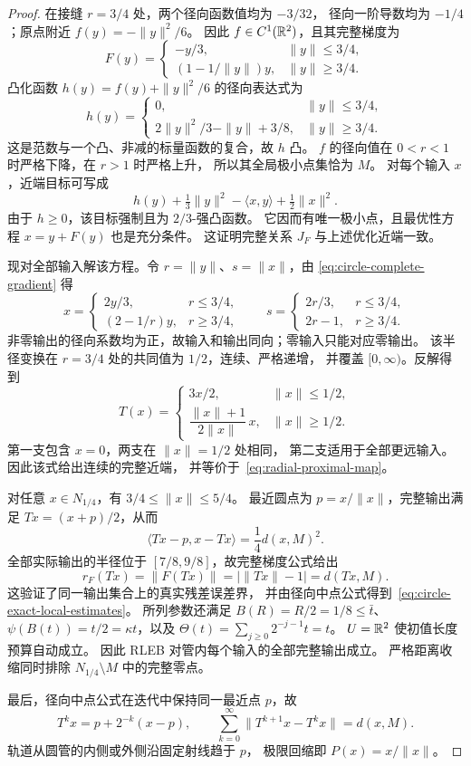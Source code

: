 \begin{proof}
在接缝 $r=3/4$ 处，两个径向函数值均为 $-3/32$，
径向一阶导数均为 $-1/4$；原点附近 $f(y)=-\|y\|^2/6$。
因此 $f\in C^1(\mathbb R^2)$，且其完整梯度为
\begin{equation}
\label{eq:circle-complete-gradient}
 F(y)=
 \begin{cases}
 -y/3,&\|y\|\le3/4,\\
 (1-1/\|y\|)y,&\|y\|\ge3/4.
 \end{cases}
\end{equation}
凸化函数 $h(y)=f(y)+\|y\|^2/6$ 的径向表达式为
\[
 h(y)=
 \begin{cases}
 0,&\|y\|\le3/4,\\
 2\|y\|^2/3-\|y\|+3/8,&\|y\|\ge3/4.
 \end{cases}
\]
这是范数与一个凸、非减的标量函数的复合，故 $h$ 凸。
$f$ 的径向值在 $0<r<1$ 时严格下降，在 $r>1$ 时严格上升，
所以其全局极小点集恰为 $M$。
对每个输入 $x$，近端目标可写成
\[
 h(y)+\tfrac13\|y\|^2-\langle x,y\rangle+\tfrac12\|x\|^2.
\]
由于 $h\ge0$，该目标强制且为 $2/3$-强凸函数。
它因而有唯一极小点，且最优性方程 $x=y+F(y)$ 也是充分条件。
这证明完整关系 $J_F$ 与上述优化近端一致。

现对全部输入解该方程。令 $r=\|y\|$、$s=\|x\|$，由
\eqref{eq:circle-complete-gradient} 得
\[
 x=
 \begin{cases}
 2y/3,&r\le3/4,\\
 (2-1/r)y,&r\ge3/4,
 \end{cases}
 \qquad
 s=
 \begin{cases}
 2r/3,&r\le3/4,\\
 2r-1,&r\ge3/4.
 \end{cases}
\]
非零输出的径向系数均为正，故输入和输出同向；零输入只能对应零输出。
该半径变换在 $r=3/4$ 处的共同值为 $1/2$，连续、严格递增，
并覆盖 $[0,\infty)$。反解得到
\begin{equation}
\label{eq:circle-all-input-prox}
 T(x)=
 \begin{cases}
 3x/2,&\|x\|\le1/2,\\
 \dfrac{\|x\|+1}{2\|x\|}\,x,&\|x\|\ge1/2.
 \end{cases}
\end{equation}
第一支包含 $x=0$，两支在 $\|x\|=1/2$ 处相同，
第二支适用于全部更远输入。因此该式给出连续的完整近端，
并等价于~\eqref{eq:radial-proximal-map}。

对任意 $x\in N_{1/4}$，有 $3/4\le\|x\|\le5/4$。
最近圆点为 $p=x/\|x\|$，完整输出满足 $Tx=(x+p)/2$，从而
\[
 \langle Tx-p,x-Tx\rangle=\frac14d(x,M)^2.
\]
全部实际输出的半径位于 $[7/8,9/8]$，故完整梯度公式给出
\[
 r_F(Tx)=\|F(Tx)\|=\bigl|\|Tx\|-1\bigr|=d(Tx,M).
\]
这验证了同一输出集合上的真实残差误差界，
并由径向中点公式得到~\eqref{eq:circle-exact-local-estimates}。
所列参数还满足 $B(R)=R/2=1/8\le\bar t$、
$\psi(B(t))=t/2=\kappa t$，以及
$\Theta(t)=\sum_{j\ge0}2^{-j-1}t=t$。
$U=\mathbb R^2$ 使初值长度预算自动成立。
因此 RLEB 对管内每个输入的全部完整输出成立。
严格距离收缩同时排除 $N_{1/4}\setminus M$ 中的完整零点。

最后，径向中点公式在迭代中保持同一最近点 $p$，故
\[
 T^kx=p+2^{-k}(x-p),\qquad
 \sum_{k=0}^{\infty}\|T^{k+1}x-T^kx\|=d(x,M).
\]
轨道从圆管的内侧或外侧沿固定射线趋于 $p$，
极限回缩即 $P(x)=x/\|x\|$。
\end{proof}


